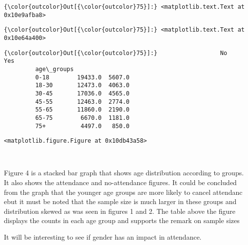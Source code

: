 \documentclass[11pt]{article}
\begin{document}
\begin{Verbatim}[commandchars=\\\{\}]
{\color{outcolor}Out[{\color{outcolor}75}]:} <matplotlib.text.Text at 0x10e9afba8>
\end{Verbatim}
            
\begin{Verbatim}[commandchars=\\\{\}]
{\color{outcolor}Out[{\color{outcolor}75}]:} <matplotlib.text.Text at 0x10e64a400>
\end{Verbatim}
            
\begin{Verbatim}[commandchars=\\\{\}]
{\color{outcolor}Out[{\color{outcolor}75}]:}                  No     Yes
         age\_groups                 
         0-18        19433.0  5607.0
         18-30       12473.0  4063.0
         30-45       17036.0  4565.0
         45-55       12463.0  2774.0
         55-65       11860.0  2190.0
         65-75        6670.0  1181.0
         75+          4497.0   850.0
\end{Verbatim}
            
    
    \begin{verbatim}
<matplotlib.figure.Figure at 0x10db43a58>
    \end{verbatim}

    
    \begin{center}
    \end{center}
    { \hspace*{\fill} \\}
    
    Figure 4 is a stacked bar graph that shows age distribution according to
groups. It also shows the attendance and no-attendance figures. It could
be concluded from the graph that the younger age groups are more likely
to cancel attendanc ebut it must be noted that the sample size is much
larger in these groups and distribution skewed as was seen in figures 1
and 2. The table above the figure displays the counts in each age group
and supports the remark on sample sizes

    It will be interesting to see if gender has an impact in attendance.
\end{document}
